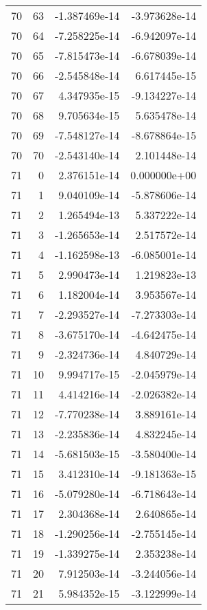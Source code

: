 \begin{tabular}{rrrr}
  70 &   63 & -1.387469e-14 & -3.973628e-14 \\
  70 &   64 & -7.258225e-14 & -6.942097e-14 \\
  70 &   65 & -7.815473e-14 & -6.678039e-14 \\
  70 &   66 & -2.545848e-14 &  6.617445e-15 \\
  70 &   67 &  4.347935e-15 & -9.134227e-14 \\
  70 &   68 &  9.705634e-15 &  5.635478e-14 \\
  70 &   69 & -7.548127e-14 & -8.678864e-15 \\
  70 &   70 & -2.543140e-14 &  2.101448e-14 \\
  71 &    0 &  2.376151e-14 &  0.000000e+00 \\
  71 &    1 &  9.040109e-14 & -5.878606e-14 \\
  71 &    2 &  1.265494e-13 &  5.337222e-14 \\
  71 &    3 & -1.265653e-14 &  2.517572e-14 \\
  71 &    4 & -1.162598e-13 & -6.085001e-14 \\
  71 &    5 &  2.990473e-14 &  1.219823e-13 \\
  71 &    6 &  1.182004e-14 &  3.953567e-14 \\
  71 &    7 & -2.293527e-14 & -7.273303e-14 \\
  71 &    8 & -3.675170e-14 & -4.642475e-14 \\
  71 &    9 & -2.324736e-14 &  4.840729e-14 \\
  71 &   10 &  9.994717e-15 & -2.045979e-14 \\
  71 &   11 &  4.414216e-14 & -2.026382e-14 \\
  71 &   12 & -7.770238e-14 &  3.889161e-14 \\
  71 &   13 & -2.235836e-14 &  4.832245e-14 \\
  71 &   14 & -5.681503e-15 & -3.580400e-14 \\
  71 &   15 &  3.412310e-14 & -9.181363e-15 \\
  71 &   16 & -5.079280e-14 & -6.718643e-14 \\
  71 &   17 &  2.304368e-14 &  2.640865e-14 \\
  71 &   18 & -1.290256e-14 & -2.755145e-14 \\
  71 &   19 & -1.339275e-14 &  2.353238e-14 \\
  71 &   20 &  7.912503e-14 & -3.244056e-14 \\
  71 &   21 &  5.984352e-15 & -3.122999e-14 \\

\end{tabular}
